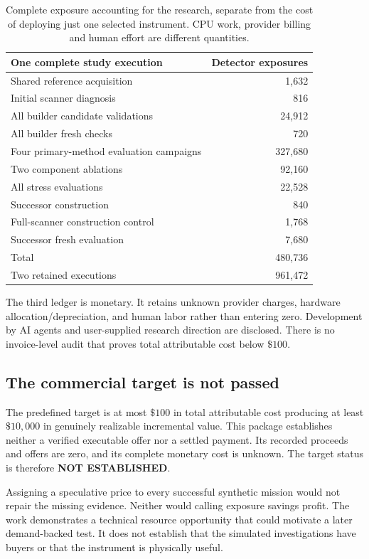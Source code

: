 \documentclass[11pt,a4paper]{article}
\begin{document}
\begin{table}[htbp]
\centering
\small
\begin{tabular}{@{}lr@{}}
\toprule
One complete study execution & Detector exposures\\
\midrule
Shared reference acquisition & 1,632\\
Initial scanner diagnosis & 816\\
All builder candidate validations & 24,912\\
All builder fresh checks & 720\\
Four primary-method evaluation campaigns & 327,680\\
Two component ablations & 92,160\\
All stress evaluations & 22,528\\
Successor construction & 840\\
Full-scanner construction control & 1,768\\
Successor fresh evaluation & 7,680\\
\midrule
Total & 480,736\\
Two retained executions & 961,472\\
\bottomrule
\end{tabular}
\caption{Complete exposure accounting for the research, separate from the cost of deploying just one selected instrument. CPU work, provider billing and human effort are different quantities.}
\end{table}

The third ledger is monetary. It retains unknown provider charges, hardware allocation/depreciation, and human labor rather than entering zero. Development by AI agents and user-supplied research direction are disclosed. There is no invoice-level audit that proves total attributable cost below \(\$100\).

\subsection{The commercial target is not passed}

The predefined target is at most \(\$100\) in total attributable cost producing at least \(\$10{,}000\) in genuinely realizable incremental value. This package establishes neither a verified executable offer nor a settled payment. Its recorded proceeds and offers are zero, and its complete monetary cost is unknown. The target status is therefore \textbf{NOT ESTABLISHED}.

Assigning a speculative price to every successful synthetic mission would not repair the missing evidence. Neither would calling exposure savings profit. The work demonstrates a technical resource opportunity that could motivate a later demand-backed test. It does not establish that the simulated investigations have buyers or that the instrument is physically useful.
\end{document}
